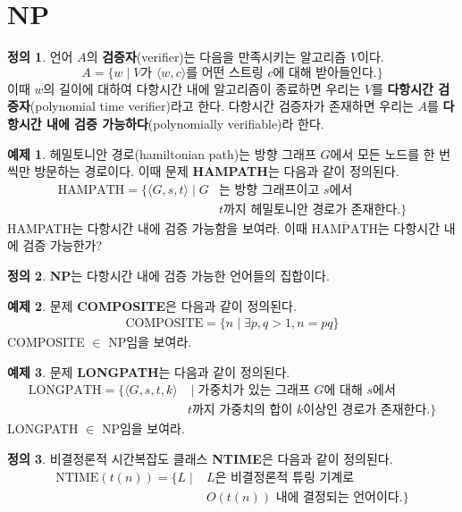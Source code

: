 \documentclass[b5paper]{book}
\theoremstyle{definition}
\newtheorem{defn}{정의}[chapter]
\newtheorem{ex}{예제}[chapter]
\begin{document}
\section{NP}
\begin{defn}
    언어 $A$의 \textbf{검증자}(verifier)는 다음을 만족시키는 알고리즘 $V$이다.
    $$A = \{w \;\vert\; V \text{가 } \langle w,c\rangle \text{를 어떤 스트링 } c \text{에 대해 받아들인다.}\}$$
    이때 $w$의 길이에 대하여 다항시간 내에 알고리즘이 종료하면 우리는 $V$를 \textbf{다항시간 검증자}(polynomial
    time verifier)라고 한다. 
    다항시간 검증자가 존재하면 우리는 $A$를 \textbf{다항시간 내에 검증 가능하다}(polynomially verifiable)라 한다.
\end{defn}
\begin{ex}
    헤밀토니안 경로(hamiltonian path)는 방향 그래프 $G$에서 모든 노드를 한 번씩만 방문하는 경로이다. 이때
    문제 \textbf{HAMPATH}는 다음과 같이 정의된다.
    \begin{align*}
        \text{HAMPATH} = \{\langle G,s,t \rangle \;\vert\; G &\text{는 방향 그래프이고 } s \text{에서 } 
        \\ & t \text{까지 헤밀토니안 경로가 존재한다.}\}
    \end{align*}
    HAMPATH는 다항시간 내에 검증 가능함을 보여라. 이때 $\overline{\text{HAMPATH}}$는 다항시간 내에 검증 가능한가?
\end{ex}
\begin{defn}
    \textbf{NP}는 다항시간 내에 검증 가능한 언어들의 집합이다.
\end{defn}
\begin{ex}
    문제 \textbf{COMPOSITE}은 다음과 같이 정의된다.
    \begin{align*}
        \text{COMPOSITE} = \{n \;\vert\; \exists p,q > 1, n = pq \}
    \end{align*}
    COMPOSITE $\in$ NP임을 보여라.
\end{ex}
\begin{ex}
    문제 \textbf{LONGPATH}는 다음과 같이 정의된다.
    \begin{align*}
    \text{LONGPATH} = \{ \langle G,s, t, k\rangle & \;\vert\; \text{가중치가 있는 그래프 }
      G \text{에 대해 } s \text{에서 } \\ 
    & t \text{까지 가중치의 합이 } k \text{이상인 경로가 존재한다.} \}
    \end{align*}
    LONGPATH $\in $ NP임을 보여라. 
\end{ex}
\begin{defn}
    비결정론적 시간복잡도 클래스 \textbf{NTIME}은 다음과 같이 정의된다. 
    \begin{align*}
        \text{NTIME}(t(n)) = \{L \;\vert\; &L\text{은 비결정론적 튜링 기계로 } \\ &O(t(n)) \text{ 내에 
        결정되는 언어이다.} \}
    \end{align*}
\end{defn}
\end{document}
